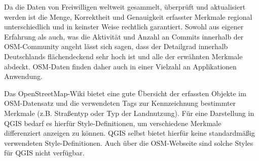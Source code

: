 			Da die Daten von Freiwilligen weltweit gesammelt, überprüft und aktualisiert werden ist die Menge, Korrektheit und Genauigkeit erfasster Merkmale regional unterschiedlich und in keinster Weise rechtlich garantiert. Sowohl aus eigener Erfahrung als auch, was die Aktivität und Anzahl an Commits innerhalb der OSM-Community angeht lässt sich sagen, dass der Detailgrad innerhalb Deutschlands flächendeckend sehr hoch ist und alle der erwähnten Merkmale abdeckt. OSM-Daten finden daher auch in einer Vielzahl an Applikationen Anwendung. \cite{web_osm_de}
			
			Das OpenStreetMap-Wiki bietet eine gute Übersicht der erfassten Objekte im OSM-Datensatz und die verwendeten Tags zur Kennzeichnung bestimmter Merkmale (z.B. Straßentyp oder Typ der Landnutzung). Für eine Darstellung in QGIS bedarf es hierfür Style-Definitionen, um verschiedene Merkmale differenziert anzeigen zu können. QGIS selbst bietet hierfür keine standardmäßig verwendeten Style-Definitionen. Auch über die OSM-Webseite sind solche Styles für QGIS nicht verfügbar. \cite{web_osm_wiki}
			
